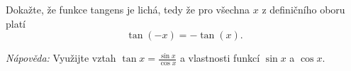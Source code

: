 \documentclass[12pt,a4paper]{article}
\begin{document}
\setcounter{section}{3}
\begin{exercise}
Dokažte, že funkce tangens je lichá, tedy že pro všechna $x$ z definičního oboru platí
\[
\tan(-x) = -\tan(x).
\]

\noindent
\textit{Nápověda:} Využijte vztah $\displaystyle \tan x = \frac{\sin x}{\cos x}$ a vlastnosti funkcí $\sin x$ a $\cos x$.
\end{exercise}
\end{document}
